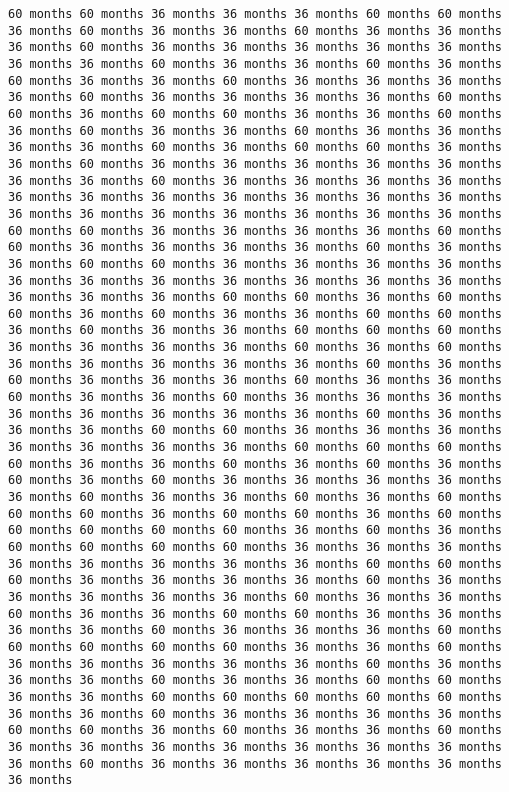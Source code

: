 \documentclass[11pt]{article}
\begin{document}
\begin{Verbatim}[commandchars=\\\{\}, frame=single, framerule=2mm, rulecolor=\color{outerrorbackground}]
60 months 60 months 36 months 36 months 36 months 60 months 60 months 36 months 60 months 36 months 36 months 60 months 36 months 36 months 36 months 60 months 36 months 36 months 36 months 36 months 36 months 36 months 36 months 60 months 36 months 36 months 60 months 36 months 60 months 36 months 36 months 60 months 36 months 36 months 36 months 36 months 60 months 36 months 36 months 36 months 36 months 60 months 60 months 36 months 60 months 60 months 36 months 36 months 60 months 36 months 60 months 36 months 36 months 60 months 36 months 36 months 36 months 36 months 60 months 36 months 60 months 60 months 36 months 36 months 60 months 36 months 36 months 36 months 36 months 36 months 36 months 36 months 60 months 36 months 36 months 36 months 36 months 36 months 36 months 36 months 36 months 36 months 36 months 36 months 36 months 36 months 36 months 36 months 36 months 36 months 36 months 60 months 60 months 36 months 36 months 36 months 36 months 60 months 60 months 36 months 36 months 36 months 36 months 60 months 36 months 36 months 60 months 60 months 36 months 36 months 36 months 36 months 36 months 36 months 36 months 36 months 36 months 36 months 36 months 36 months 36 months 36 months 60 months 60 months 36 months 60 months 60 months 36 months 60 months 36 months 36 months 60 months 60 months 36 months 60 months 36 months 36 months 60 months 60 months 60 months 36 months 36 months 36 months 36 months 60 months 36 months 60 months 36 months 36 months 36 months 36 months 36 months 60 months 36 months 60 months 36 months 36 months 36 months 60 months 36 months 36 months 60 months 36 months 36 months 60 months 36 months 36 months 36 months 36 months 36 months 36 months 36 months 36 months 60 months 36 months 36 months 36 months 60 months 60 months 36 months 36 months 36 months 36 months 36 months 36 months 36 months 60 months 60 months 60 months 60 months 36 months 36 months 60 months 36 months 60 months 36 months 60 months 36 months 60 months 36 months 36 months 36 months 36 months 36 months 60 months 36 months 36 months 60 months 36 months 60 months 60 months 60 months 36 months 60 months 60 months 36 months 60 months 60 months 60 months 60 months 60 months 36 months 60 months 36 months 60 months 60 months 60 months 60 months 36 months 36 months 36 months 36 months 36 months 36 months 36 months 36 months 60 months 60 months 60 months 36 months 36 months 36 months 36 months 60 months 36 months 36 months 36 months 36 months 36 months 60 months 36 months 36 months 60 months 36 months 36 months 60 months 60 months 36 months 36 months 36 months 36 months 60 months 36 months 36 months 36 months 60 months 60 months 60 months 60 months 60 months 36 months 36 months 60 months 36 months 36 months 36 months 36 months 36 months 60 months 36 months 36 months 36 months 60 months 36 months 36 months 60 months 60 months 36 months 36 months 60 months 60 months 60 months 60 months 60 months 36 months 36 months 60 months 36 months 36 months 36 months 36 months 60 months 60 months 36 months 60 months 36 months 36 months 60 months 36 months 36 months 36 months 36 months 36 months 36 months 36 months 36 months 60 months 36 months 36 months 36 months 36 months 36 months 36 months 
\end{Verbatim}
\end{document}
